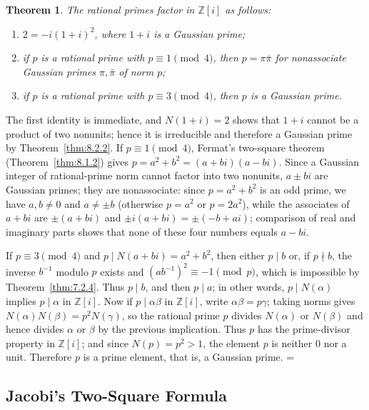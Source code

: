 \documentclass[11pt]{article}
\makeatletter
\let\nt@closedisplay\]
\def\nt@guardedclose{\@ifnextchar\par{\nt@closeafterpar}{\@ifnextchar\end{\postdisplaypenalty\@M\nt@closedisplay}{\nt@closedisplay}}}
\def\nt@closeafterpar\par{\@ifnextchar\par{\nt@closeafterpar}{\@ifnextchar\end{\postdisplaypenalty\@M\nt@closedisplay\par}{\nt@closedisplay\par}}}
\renewenvironment{proof}[1][\proofname]{\par
  \pushQED{\qed}\normalfont\topsep\medskipamount\edef\nt@afterproof{\@endparpenalty=\the\@endparpenalty\relax}\@beginparpenalty\@M\@endparpenalty\@M\let\]\nt@guardedclose\trivlist\item[]\textit{#1\@addpunct{.}} \ignorespaces}{\ifvmode\addpenalty\@M\fi\popQED\nt@afterproof\endtrivlist\@endpefalse}
\theoremstyle{ntstyle}
\newtheorem{theorem}{Theorem}[subsection]
\makeatother
\begin{document}
\begin{theorem}\label{thm:8.2.3}
  The rational primes factor in $\mathbb{Z}[i]$ as follows:
  \begin{enumerate}[label={\alph*)}]
    \item $2=-i(1+i)^2$, where $1+i$ is a Gaussian prime;
    \item if $p$ is a rational prime with $p\equiv1\pmod{4}$, then $p=\pi\bar\pi$ for nonassociate
          Gaussian primes $\pi,\bar\pi$ of norm $p$;
    \item if $p$ is a rational prime with $p\equiv3\pmod{4}$, then $p$ is a Gaussian prime.
  \end{enumerate}

\end{theorem}

\begin{proof} The first identity is immediate, and $N(1+i)=2$ shows that
  $1+i$ cannot be a product of two nonunits; hence it is irreducible and
  therefore a Gaussian prime by Theorem~\ref{thm:8.2.2}. If
  $p\equiv1\pmod{4}$, Fermat's two-square theorem (Theorem~\ref{thm:8.1.2}) gives
  $p=a^2+b^2=(a+bi)(a-bi)$. Since a Gaussian integer of rational-prime
  norm cannot factor into two nonunits, $a\pm bi$ are Gaussian primes;
  they are nonassociate: since $p = a^2+b^2$ is an odd prime, we have
  $a,b\neq0$ and $a\neq\pm b$ (otherwise $p = a^2$ or $p = 2a^2$), while the
  associates of $a+bi$ are $\pm(a+bi)$ and $\pm i(a+bi) = \pm(-b+ai)$;
  comparison of real and imaginary parts shows that none of these four numbers equals
  $a-bi$.

  If $p\equiv3\pmod{4}$ and $p\mid N(a+bi)=a^2+b^2$, then either $p\mid b$
  or, if $p\nmid b$, the inverse $b^{-1}$ modulo $p$ exists and
  $(ab^{-1})^2\equiv-1\pmod{p}$, which is impossible by Theorem~\ref{thm:7.2.4}. Thus
  $p\mid b$, and then $p\mid a$; in other words, $p\mid N(\alpha)$
  implies $p\mid\alpha$ in $\mathbb{Z}[i]$. Now if $p\mid\alpha\beta$ in
  $\mathbb{Z}[i]$, write $\alpha\beta=p\gamma$; taking norms gives
  $N(\alpha)N(\beta)=p^2N(\gamma)$, so the rational prime $p$ divides
  $N(\alpha)$ or $N(\beta)$ and hence divides $\alpha$ or $\beta$ by the
  previous implication. Thus $p$ has the prime-divisor property in
  $\mathbb{Z}[i]$; and since $N(p)=p^2>1$, the element $p$ is neither $0$ nor a unit.
  Therefore $p$ is a prime element, that is, a Gaussian prime.
\end{proof}
\subsection{Jacobi's Two-Square Formula}
\end{document}
